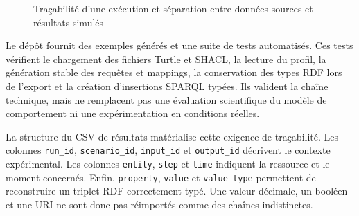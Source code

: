 \documentclass{article}
\begin{document}
\begin{figure}[htbp]
    \centering
    \caption{Traçabilité d'une exécution et séparation entre données sources et résultats simulés}
    \label{fig:simulation-provenance}
\end{figure}

Le dépôt fournit des exemples générés et une suite de tests automatisés. Ces tests vérifient le chargement des fichiers Turtle et SHACL, la lecture du profil, la génération stable des requêtes et mappings, la conservation des types RDF lors de l'export et la création d'insertions SPARQL typées. Ils valident la chaîne technique, mais ne remplacent pas une évaluation scientifique du modèle de comportement ni une expérimentation en conditions réelles.

La structure du CSV de résultats matérialise cette exigence de traçabilité. Les colonnes \texttt{run\_id}, \texttt{scenario\_id}, \texttt{input\_id} et \texttt{output\_id} décrivent le contexte expérimental. Les colonnes \texttt{entity}, \texttt{step} et \texttt{time} indiquent la ressource et le moment concernés. Enfin, \texttt{property}, \texttt{value} et \texttt{value\_type} permettent de reconstruire un triplet RDF correctement typé. Une valeur décimale, un booléen et une URI ne sont donc pas réimportés comme des chaînes indistinctes.
\end{document}
